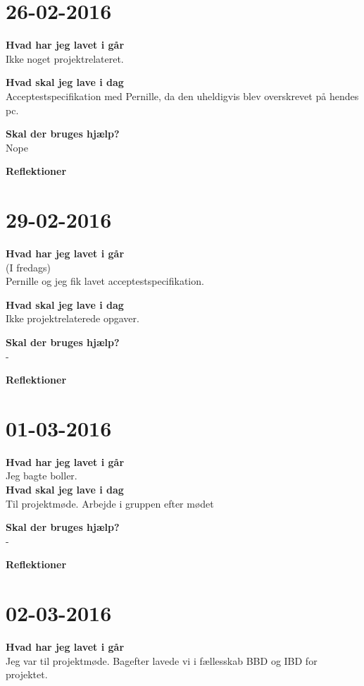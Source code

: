 \documentclass{article}
\begin{document}
	
	\section{26-02-2016}
		
	\textbf{Hvad har jeg lavet i går}\\
	Ikke noget projektrelateret.
		
	\textbf{Hvad skal jeg lave i dag}\\
	Acceptestspecifikation med Pernille, da den uheldigvis blev overskrevet på hendes pc.  
		
	\textbf{Skal der bruges hjælp?}\\
	Nope
		
	\textbf{Reflektioner}
	
	
	\section{29-02-2016}
	
	\textbf{Hvad har jeg lavet i går}\\
	(I fredags)\\
	Pernille og jeg fik lavet acceptestspecifikation.
	
	\textbf{Hvad skal jeg lave i dag}\\
	Ikke projektrelaterede opgaver.   
	
	\textbf{Skal der bruges hjælp?}\\
	-
	
	\textbf{Reflektioner}
	
	
	\section{01-03-2016}
	
	\textbf{Hvad har jeg lavet i går}\\
	Jeg bagte boller.\\
	
	\textbf{Hvad skal jeg lave i dag}\\
	Til projektmøde. Arbejde i gruppen efter mødet   
	
	\textbf{Skal der bruges hjælp?}\\
	-
	
	\textbf{Reflektioner}
	

	\section{02-03-2016}
	
	\textbf{Hvad har jeg lavet i går}\\
	Jeg var til projektmøde. Bagefter lavede vi i fællesskab BBD og IBD for projektet.\\
	
\end{document}
